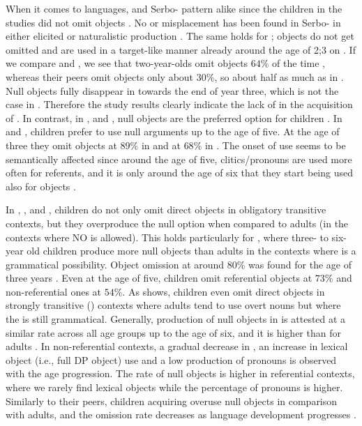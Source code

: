 \documentclass[output=paper,modfonts,newtxmath,hidelinks,]{langscibook}
\begin{document}
When it comes to  languages,  and Serbo- pattern alike since the children in the studies did not omit objects \citep{Radeva-Bork2013,Radeva-Bork2015,Stiasny2006}. No  or misplacement has been found in Serbo- in either elicited or naturalistic production \citep{Stiasny2006}. The same holds for ; objects do not get omitted and are used in a target-like manner already around the age of 2;3 on \citep{Radeva-Bork2015}. If we compare  and , we see that  two-year-olds omit objects $64\%$ of the time \citep{Schaeffer2000}, whereas their  peers omit objects only about $30\%$, so about half as much as in . Null objects fully disappear in  towards the end of year three, which is not the case in . Therefore the study results clearly indicate the lack of  in the acquisition of . In contrast, in ,  and , null objects are the preferred option for children \citep{Tryzna2015,Mykhaylyk-Sopata2016,Gordishevsky-Avrutin2004,Frolova2016}. In  and , children prefer to use null arguments up to the age of five. At the age of three they omit objects at $89\%$ in  and at $68\%$ in  \citep{Mykhaylyk-Sopata2016}. The onset of  use seems to be semantically affected since around the age of five, clitics/pronouns are used more often for  referents, and it is only around the age of six that they start being used also for  objects \citep{Mykhaylyk-Sopata2016}.

In , , and , children do not only omit direct objects in obligatory transitive contexts, but they overproduce the null option when compared to adults (in the contexts where NO is allowed). This holds particularly for , where three- to six-year old children produce more null objects than adults in the contexts where  is a grammatical possibility. Object omission at around $80\%$ was found for the age of three years \citep{Frolova2016}. Even at the age of five,  children omit referential objects at $73\%$ and non-referential ones at $54\%$. As \citet{Frolova} shows,  children even omit direct objects in strongly transitive () contexts where adults tend to use overt nouns but where the  is still grammatical. Generally, production of null objects in  is attested at a similar rate across all age groups up to the age of six, and it is higher than for adults \citep{Frolova2016}. In non-referential contexts, a gradual decrease in , an increase in lexical object (i.e., full DP object) use and a low production of pronouns is observed with the age progression. The rate of null objects is higher in referential contexts, where we rarely find lexical objects while the percentage of pronouns is higher. Similarly to their  peers, children acquiring  overuse null objects in comparison with adults, and the omission rate decreases as language development progresses \citep{Mykhaylyk-Sopata2016,Tryzna2015}.
\end{document}
